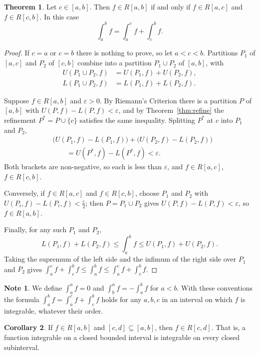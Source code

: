 \documentclass[11pt,a4paper]{article}
\numberwithin{equation}{section}
\theoremstyle{definition}
\newtheorem{thm}{Theorem}[subsection]
\newtheorem{coro}[thm]{Corollary}
\newtheorem*{note}{Note}
\begin{document}
\begin{thm}
Let $c\in [a,b]$. Then $f\in R[a,b]$ if and only if $f\in R[a,c]$ and $f\in R[c,b]$. In this case
$$\int^b_af = \int^c_af + \int^b_cf.$$
\end{thm}

\begin{proof}
If $c = a$ or $c = b$ there is nothing to prove, so let $a<c<b$. Partitions $P_1$ of $[a,c]$ and $P_2$ of $[c,b]$ combine into a partition $P_1\cup P_2$ of $[a,b]$, with
\begin{align*}
U(P_1\cup P_2, f) &= U(P_1,f) + U(P_2,f),\\
L(P_1\cup P_2, f) &= L(P_1,f) + L(P_2,f).
\end{align*}

Suppose $f\in R[a,b]$ and $\varepsilon>0$. By Riemann's Criterion there is a partition $P$ of $[a,b]$ with $U(P,f) - L(P,f) < \varepsilon$, and by Theorem~\ref{thm:refine} the refinement $P^* = P\cup\{c\}$ satisfies the same inequality. Splitting $P^*$ at $c$ into $P_1$ and $P_2$,
\begin{align*}
&\bigl(U(P_1,f) - L(P_1,f)\bigr) + \bigl(U(P_2,f) - L(P_2,f)\bigr)\\
&\qquad = U(P^*,f) - L(P^*,f) < \varepsilon .
\end{align*}
Both brackets are non-negative, so each is less than $\varepsilon$, and $f\in R[a,c]$, $f\in R[c,b]$.

Conversely, if $f\in R[a,c]$ and $f\in R[c,b]$, choose $P_1$ and $P_2$ with $U(P_i,f) - L(P_i,f) < \frac{\varepsilon}{2}$; then $P = P_1\cup P_2$ gives $U(P,f) - L(P,f) <\varepsilon$, so $f\in R[a,b]$.

Finally, for any such $P_1$ and $P_2$,
$$L(P_1,f) + L(P_2,f) \leq \int_a^b f\leq U(P_1,f) + U(P_2,f).$$
Taking the supremum of the left side and the infimum of the right side over $P_1$ and $P_2$ gives $\int_a^c f + \int_c^b f\leq\int_a^b f\leq\int_a^c f + \int_c^b f$.
\end{proof}

\begin{note}
We define $\int_a^a f = 0$ and $\int_b^a f = -\int_a^b f$ for $a<b$. With these conventions the formula $\int^b_af = \int^c_af + \int^b_cf$ holds for any $a,b,c$ in an interval on which $f$ is integrable, whatever their order.
\end{note}


\begin{coro}
If $f\in R[a,b]$ and $[c,d]\subseteq [a,b]$, then $f\in R[c,d]$. That is, a function integrable on a closed bounded interval is integrable on every closed subinterval.
\end{coro}
\end{document}

